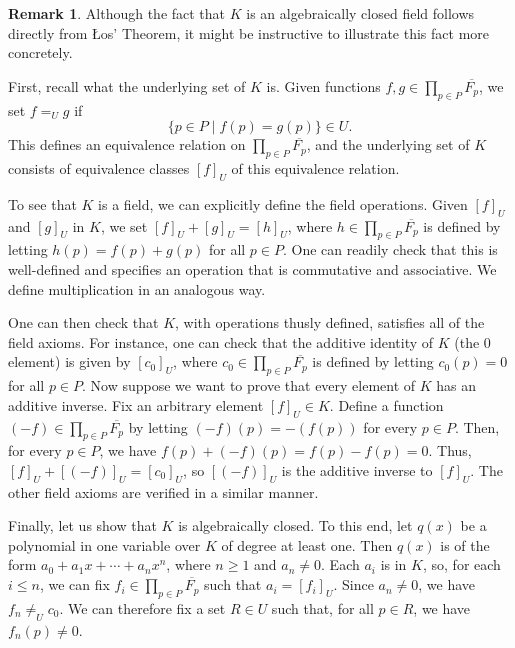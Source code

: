 \documentclass[a4paper]{memoir}
\theoremstyle{definition}
\newtheorem{remark}[theorem]{Remark}
\begin{document}
\begin{remark}
  Although the fact that $K$ is an algebraically closed field follows directly from 
  \L os' Theorem, it might be instructive to illustrate this fact more concretely.
  
  First, recall what the underlying set of $K$ is. Given functions $f,g \in 
  \prod_{p \in P} \overline{F_p}$, we set $f =_U g$ if 
  \[
    \{p \in P \mid f(p) = g(p)\} \in U.
  \]
  This defines an equivalence relation on $\prod_{p \in P} \overline{F_p}$, and the 
  underlying set of $K$ consists of equivalence classes $[f]_U$ of this equivalence 
  relation.
  
  To see that $K$ is a field, we can explicitly define the field operations. Given 
  $[f]_U$ and $[g]_U$ in $K$, we set $[f]_U + [g]_U = [h]_U$, where $h \in 
  \prod_{p \in P} \overline{F_p}$ is defined by letting $h(p) = f(p) + g(p)$ for 
  all $p \in P$. One can readily check that this is well-defined and specifies an 
  operation that is commutative and associative. We define multiplication in an analogous 
  way. 
  
  One can then check that $K$, with operations thusly defined, satisfies all of the field 
  axioms. For instance, one can check that the additive identity of $K$ (the $0$ element) 
  is given by $[c_0]_U$, where $c_0 \in \prod_{p \in P} \overline{F_p}$ is defined by 
  letting $c_0(p) = 0$ for all $p \in P$. Now suppose we want to prove that every 
  element of $K$ has an additive inverse. Fix an arbitrary element $[f]_U \in K$. 
  Define a function $(-f) \in \prod_{p \in P} \overline{F_p}$ by letting 
  $(-f)(p) = -(f(p))$ for every $p \in P$. Then, for every $p \in P$, we have 
  $f(p) + (-f)(p) = f(p) - f(p) = 0$. Thus, $[f]_U + [(-f)]_U = [c_0]_U$, so 
  $[(-f)]_U$ is the additive inverse to $[f]_U$. The other field axioms are verified 
  in a similar manner.
  
  Finally, let us show that $K$ is algebraically closed. To this end, let $q(x)$ be 
  a polynomial in one variable over $K$ of degree at least one. Then $q(x)$ is of the form 
  $a_0 + a_1 x + \cdots + a_n x^n$, where $n \geq 1$ and $a_n \neq 0$. Each $a_i$ is in 
  $K$, so, for each $i \leq n$, we can fix $f_i \in \prod_{p \in P} \overline{F_p}$ such 
  that $a_i = [f_i]_U$. Since $a_n \neq 0$, we have $f_n \neq_U c_0$. We can therefore 
  fix a set $R \in U$ such that, for all $p \in R$, we have $f_n(p) \neq 0$.
  

\end{remark}
\end{document}
